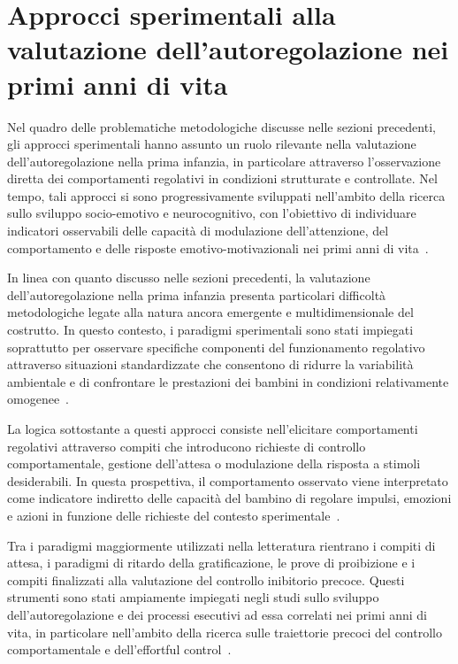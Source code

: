     \section{Approcci sperimentali alla valutazione dell'autoregolazione nei primi anni di vita}
    \label{sec:3_4}

        Nel quadro delle problematiche metodologiche discusse nelle sezioni precedenti, gli approcci sperimentali hanno assunto un ruolo rilevante nella valutazione dell'autoregolazione nella prima infanzia, in particolare attraverso l'osservazione diretta dei comportamenti regolativi in condizioni strutturate e controllate. Nel tempo, tali approcci si sono progressivamente sviluppati nell'ambito della ricerca sullo sviluppo socio-emotivo e neurocognitivo, con l'obiettivo di individuare indicatori osservabili delle capacità di modulazione dell'attenzione, del comportamento e delle risposte emotivo-motivazionali nei primi anni di vita~\cite{garon2008,hughes2002}.

        In linea con quanto discusso nelle sezioni precedenti, la valutazione dell'autoregolazione nella prima infanzia presenta particolari difficoltà metodologiche legate alla natura ancora emergente e multidimensionale del costrutto. In questo contesto, i paradigmi sperimentali sono stati impiegati soprattutto per osservare specifiche componenti del funzionamento regolativo attraverso situazioni standardizzate che consentono di ridurre la variabilità ambientale e di confrontare le prestazioni dei bambini in condizioni relativamente omogenee~\cite{mcclelland2012,carlson2005}.

        La logica sottostante a questi approcci consiste nell'elicitare comportamenti regolativi attraverso compiti che introducono richieste di controllo comportamentale, gestione dell'attesa o modulazione della risposta a stimoli desiderabili. In questa prospettiva, il comportamento osservato viene interpretato come indicatore indiretto delle capacità del bambino di regolare impulsi, emozioni e azioni in funzione delle richieste del contesto sperimentale~\cite{garon2008,doebel2020}.

        Tra i paradigmi maggiormente utilizzati nella letteratura rientrano i compiti di attesa, i paradigmi di ritardo della gratificazione, le prove di proibizione e i compiti finalizzati alla valutazione del controllo inibitorio precoce. Questi strumenti sono stati ampiamente impiegati negli studi sullo sviluppo dell'autoregolazione e dei processi esecutivi ad essa correlati nei primi anni di vita, in particolare nell'ambito della ricerca sulle traiettorie precoci del controllo comportamentale e dell'effortful control~\cite{kochanska2000,kochanska2001,posner2000}.

